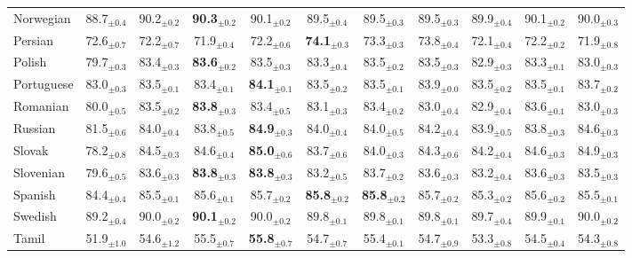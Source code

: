 \begin{table*}[ht]
{\begin{tabular}{lcccccccccc}
Norwegian & 88.7$_{\pm 0.4}$ & 90.2$_{\pm 0.2}$ & \textbf{90.3}$_{\pm 0.2}$ & 90.1$_{\pm 0.2}$ & 89.5$_{\pm 0.4}$ & 89.5$_{\pm 0.3}$ & 89.5$_{\pm 0.3}$ & 89.9$_{\pm 0.4}$ & 90.1$_{\pm 0.2}$ & 90.0$_{\pm 0.3}$ \\
Persian & 72.6$_{\pm 0.7}$ & 72.2$_{\pm 0.7}$ & 71.9$_{\pm 0.4}$ & 72.2$_{\pm 0.6}$ & \textbf{74.1}$_{\pm 0.3}$ & 73.3$_{\pm 0.3}$ & 73.8$_{\pm 0.4}$ & 72.1$_{\pm 0.4}$ & 72.2$_{\pm 0.2}$ & 71.9$_{\pm 0.8}$ \\
Polish & 79.7$_{\pm 0.3}$ & 83.4$_{\pm 0.3}$ & \textbf{83.6}$_{\pm 0.2}$ & 83.5$_{\pm 0.3}$ & 83.3$_{\pm 0.4}$ & 83.5$_{\pm 0.2}$ & 83.5$_{\pm 0.3}$ & 82.9$_{\pm 0.3}$ & 83.3$_{\pm 0.1}$ & 83.0$_{\pm 0.3}$ \\
Portuguese & 83.0$_{\pm 0.3}$ & 83.5$_{\pm 0.1}$ & 83.4$_{\pm 0.1}$ & \textbf{84.1}$_{\pm 0.1}$ & 83.5$_{\pm 0.2}$ & 83.5$_{\pm 0.1}$ & 83.9$_{\pm 0.0}$ & 83.5$_{\pm 0.2}$ & 83.5$_{\pm 0.1}$ & 83.7$_{\pm 0.2}$ \\
Romanian & 80.0$_{\pm 0.5}$ & 83.5$_{\pm 0.2}$ & \textbf{83.8}$_{\pm 0.3}$ & 83.4$_{\pm 0.5}$ & 83.1$_{\pm 0.3}$ & 83.4$_{\pm 0.2}$ & 83.0$_{\pm 0.4}$ & 82.9$_{\pm 0.4}$ & 83.6$_{\pm 0.1}$ & 83.0$_{\pm 0.3}$ \\
Russian & 81.5$_{\pm 0.6}$ & 84.0$_{\pm 0.4}$ & 83.8$_{\pm 0.5}$ & \textbf{84.9}$_{\pm 0.3}$ & 84.0$_{\pm 0.4}$ & 84.0$_{\pm 0.5}$ & 84.2$_{\pm 0.4}$ & 83.9$_{\pm 0.5}$ & 83.8$_{\pm 0.3}$ & 84.6$_{\pm 0.3}$ \\
Slovak & 78.2$_{\pm 0.8}$ & 84.5$_{\pm 0.3}$ & 84.6$_{\pm 0.4}$ & \textbf{85.0}$_{\pm 0.6}$ & 83.7$_{\pm 0.6}$ & 84.0$_{\pm 0.3}$ & 84.3$_{\pm 0.6}$ & 84.2$_{\pm 0.4}$ & 84.6$_{\pm 0.3}$ & 84.9$_{\pm 0.3}$ \\
Slovenian & 79.6$_{\pm 0.5}$ & 83.6$_{\pm 0.3}$ & \textbf{83.8}$_{\pm 0.3}$ & \textbf{83.8}$_{\pm 0.3}$ & 83.2$_{\pm 0.5}$ & 83.7$_{\pm 0.2}$ & 83.6$_{\pm 0.3}$ & 83.2$_{\pm 0.4}$ & 83.6$_{\pm 0.3}$ & 83.5$_{\pm 0.3}$ \\
Spanish & 84.4$_{\pm 0.4}$ & 85.5$_{\pm 0.1}$ & 85.6$_{\pm 0.1}$ & 85.7$_{\pm 0.2}$ & \textbf{85.8}$_{\pm 0.2}$ & \textbf{85.8}$_{\pm 0.2}$ & 85.7$_{\pm 0.2}$ & 85.3$_{\pm 0.2}$ & 85.6$_{\pm 0.2}$ & 85.5$_{\pm 0.1}$ \\
Swedish & 89.2$_{\pm 0.4}$ & 90.0$_{\pm 0.2}$ & \textbf{90.1}$_{\pm 0.2}$ & 90.0$_{\pm 0.2}$ & 89.8$_{\pm 0.1}$ & 89.8$_{\pm 0.1}$ & 89.8$_{\pm 0.1}$ & 89.7$_{\pm 0.4}$ & 89.9$_{\pm 0.1}$ & 90.0$_{\pm 0.2}$ \\
Tamil & 51.9$_{\pm 1.0}$ & 54.6$_{\pm 1.2}$ & 55.5$_{\pm 0.7}$ & \textbf{55.8}$_{\pm 0.7}$ & 54.7$_{\pm 0.7}$ & 55.4$_{\pm 0.1}$ & 54.7$_{\pm 0.9}$ & 53.3$_{\pm 0.8}$ & 54.5$_{\pm 0.4}$ & 54.3$_{\pm 0.8}$ \\

\end{tabular}}
\end{table*}
